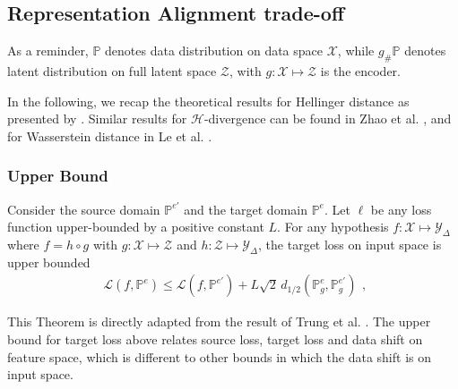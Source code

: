 \subsection{Representation Alignment trade-off}
\label{apd:tradeoff}
As a reminder, $\mathbb{P}$ denotes data distribution on data space $\mathcal{X}$, while $g_{\#}\mathbb{P}$ denotes latent distribution on full latent space $\mathcal{Z}$, with $g: \mathcal{X} \mapsto \mathcal{Z}$ is the encoder. 

In the following, we recap the theoretical results for Hellinger distance as presented by \cite{phung2021learning}. Similar results for $\mathcal{H}$-divergence can be found in Zhao et al. \cite{zhao2019learning}, and for Wasserstein distance in Le et al. \cite{le2021lamda}.

\subsubsection{Upper Bound}

\begin{theorem} 
\label{thm:single_bound_A}Consider the source domain
$\mathbb{P}^{e'}$ and the
target domain $\mathbb{P}^{e}$. Let $\ell$ be any loss function
upper-bounded by a positive constant $L$. For any hypothesis $f:\mathcal{X}\mapsto\mathcal{Y}_{\Delta}$
where $f=h\circ g$ with $g:\mathcal{X}\mapsto\mathcal{Z}$
and $h:\mathcal{Z}\mapsto\mathcal{Y}_{\Delta}$, the target
loss on input space is upper bounded 
\begin{equation}
\begin{aligned}\mathcal{L}\left(f,\mathbb{P}^{e}\right)\leq\mathcal{L}\left(f,\mathbb{P}^{e'}\right)+L\sqrt{2}\,d_{1/2}\left(\mathbb{P}_{g}^{e},\mathbb{P}_{g}^{e'}\right)\end{aligned}
,\label{eq:input_bound_1-1}
\end{equation}
\end{theorem}

This Theorem is directly adapted from the result of Trung et al. \cite{phung2021learning}.
The upper bound for target loss above relates source loss, target loss and data shift on feature space, which is different to other bounds in which the data shift is on input space.

